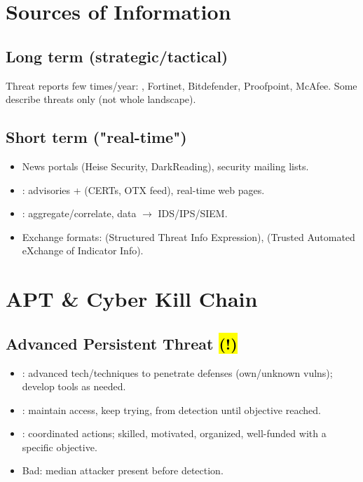 \section{Sources of Information}

\subsection{Long term (strategic/tactical)}
Threat reports few times/year: , Fortinet, Bitdefender, Proofpoint, McAfee. Some describe threats only (not whole landscape).

\subsection{Short term ("real-time")}
\begin{itemize}
\item News portals (Heise Security, DarkReading), security mailing lists.
\item {}: advisories +  (CERTs, OTX feed), real-time web pages.
\item {}: aggregate/correlate,  data $\to$ IDS/IPS/SIEM.
\item Exchange formats:  (Structured Threat Info Expression),  (Trusted Automated eXchange of Indicator Info).
\end{itemize}

\section{APT \& Cyber Kill Chain}

\subsection{Advanced Persistent Threat \hl{(!)}}
\begin{itemize}
\item {}: advanced tech/techniques to penetrate defenses (own/unknown vulns); develop tools as needed.
\item {}: maintain  access, keep trying,  from detection until objective reached.
\item {}: coordinated  actions; skilled, motivated, organized, well-funded with a specific objective.
\item Bad: median  attacker present before detection.
\end{itemize}

